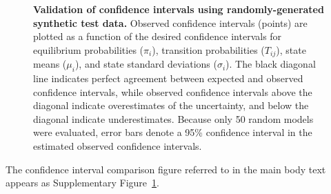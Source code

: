 \documentclass[endfloats,prl,twocolumn,superscriptaddress,nofootinbib,longbibliography]{revtex4-1}
\begin{document}
\begin{figure}[tbp]
\noindent
{}
\caption{{\bf Validation of confidence intervals using randomly-generated synthetic test data.}
Observed confidence intervals (points) are plotted as a function of the desired confidence intervals for equilibrium probabilities ($\pi_i$), transition probabilities ($T_{ij}$), state means ($\mu_i$), and state standard deviations ($\sigma_i$).
The black diagonal line indicates perfect agreement between expected and observed confidence intervals, while observed confidence intervals above the diagonal indicate overestimates of the uncertainty, and below the diagonal indicate underestimates.
Because only 50 random models were evaluated, error bars denote a 95\% confidence interval in the estimated observed confidence intervals.
\label{figure:validation-confidence-intervals}}
\end{figure}

The confidence interval comparison figure referred to in the main body text appears as Supplementary Figure~\ref{figure:validation-confidence-intervals}.

\end{document}
